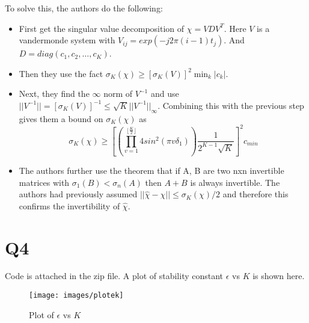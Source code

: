 \documentclass{article}
\begin{document}
To solve this, the authors do the following:
\begin{itemize}
\item First get the singular value decomposition of $\chi = VDV^T$. Here $V$ is a vandermonde system with $V_{ij} = exp(-j2 \pi (i-1) t_j)$. And $D = diag(c_1, c_2, \ldots, c_K)$.
\item Then they use the fact $\sigma_K(\chi) \ge [\sigma_K(V)]^2 \min_k |c_k|$.
\item Next, they find the $\infty$ norm of $V^{-1}$ and use $||V^{-1}|| = [\sigma_K(V)]^{-1} \le \sqrt{K} ||V^{-1}||_{\infty}$. Combining this with the previous step gives them a bound on $\sigma_K(\chi)$ as
  $$\sigma_K(\chi) \ge [(\prod_{v=1}^{\lfloor \frac{K}{2} \rfloor} 4 sin^2(\pi v \delta_1)) \frac{1}{2^{K-1} \sqrt{K}}]^2 c_{min}$$
\item The authors further use the theorem that if A, B are two nxn invertible matrices with $\sigma_1(B) < \sigma_n(A)$ then $A + B$ is always invertible. The authors had previously assumed $||\hat{\chi} - \chi|| \le \sigma_K(\chi) / 2$ and therefore this confirms the invertibility of $\hat{\chi}$.
\end{itemize}

\section*{Q4}
Code is attached in the zip file. A plot of stability constant $\epsilon$ vs $K$ is shown here.
\begin{figure}[H]
  \centering
  \texttt{[image: images/plotek]}
  \caption{Plot of $\epsilon$ vs $K$}
  \label{fig:1}
\end{figure}
\end{document}

